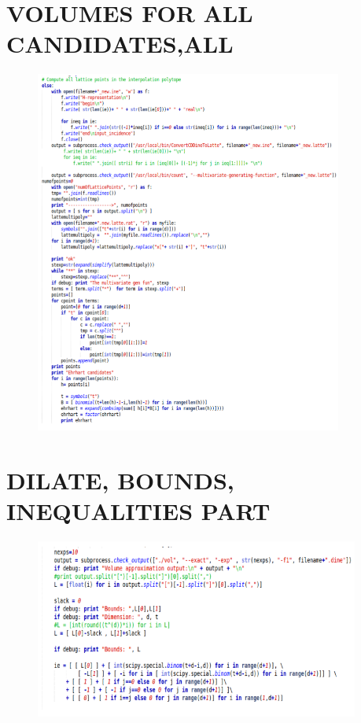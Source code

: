 \documentclass[12pt,twoside]{article}
\begin{document}
\section{VOLUMES FOR ALL CANDIDATES,ALL}

\begin{figure}[!h]
  		\centering
         	\includegraphics[width=0.90\textwidth]{allLatte.png}
		
	\end{figure}	
\newpage
\section{DILATE, BOUNDS, INEQUALITIES PART}

\begin{figure}[!h]
  		\centering
         	\includegraphics[width=0.95\textwidth]{dilateBounds.png}
		
	\end{figure}	
\end{document}
